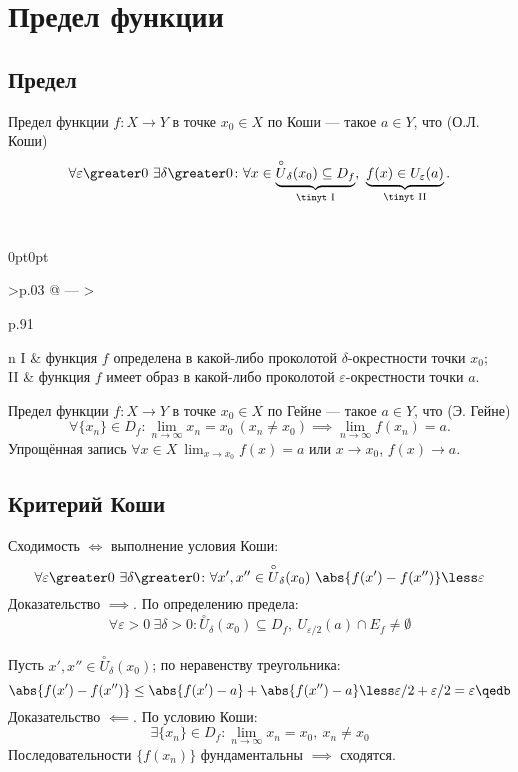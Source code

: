 \section{Предел функции}

\subsection{Предел}

{\bold Предел} функции $f\colon X\to Y$ в точке $x_0\in X$ {\ital по Коши} --- такое
$a\in Y$, что {\ital\color{desc} (О.Л. Коши)}
$$\forall\varepsilon\greater 0\ \exists\delta\greater 0\colon\forall x\in\underbrace{
\overset{\circ}{U}_\delta(x_0)\subseteq D_f}_{\text{\tinyt I}},\ \underbrace{f(x)\in U_\varepsilon(a)}_{\text{\tinyt II}}.$$\\
\begin{tabularc}{0pt}{0pt}{>{\raggedleft\arraybackslash}p{.03\linewidth} @{ --- } 
>{\raggedright\arraybackslash}p{.91\linewidth}}{n}
I & функция $f$ определена в какой-либо проколотой $\delta$-окрестности точки $x_0$;
\\[18pt]
II & функция $f$ имеет образ в какой-либо проколотой $\varepsilon$-окрестности точки 
$a$.  
\end{tabularc}

{\bold Предел} функции $f\colon X\to Y$ в точке $x_0\in X$ {\ital по Гейне} --- такое
$a\in Y$, что {\ital\color{desc} (Э. Гейне)}
$$\forall\{x_n\}\in D_f\colon\lim_{n\to\infty}x_n=x_0\ (x_n\neq x_0)\implies\lim_{n\to
\infty}f(x_n)=a.$$
Упрощённая запись $\forall x\in X\ \lim_{x\to x_0}f(x)=a$ или $x\to x_0$, $f(x)\to a$.

\subsection{Критерий Коши}

Сходимость $\iff$ выполнение {\ital условия Коши}:\\[-8pt]
$$\forall\varepsilon\greater 0\ \exists\delta\greater 0\colon\forall x',x''\in\overset
{\circ}{U}_\delta(x_0)\ \abs{f(x')-f(x'')}\less\varepsilon$$
{\bold Доказательство $\implies$.} По определению предела:\\[-8pt]
$$\forall\varepsilon\greater 0\ \exists\delta\greater 0\colon\overset{\circ}{U}_\delta
(x_0)\subseteq D_f,\ U_{\varepsilon/2}(a)\cap E_f\neq\emptyset$$\\[-6pt]
Пусть $x',x''\in\overset{\circ}{U}_\delta(x_0)$; по неравенству треугольника:
$$\abs{f(x')-f(x'')}\leq\abs{f(x')-a}+\abs{f(x'')-a}\less\varepsilon/2+\varepsilon/2=
\varepsilon\qedb$$
{\bold Доказательство $\impliedby$.} По условию Коши:
$$\exists\{x_n\}\in D_f\colon\lim_{n\to\infty}x_n=x_0,\ x_n\neq x_0$$
Последовательности $\{f(x_n)\}$ фундаментальны $\implies$ сходятся.

